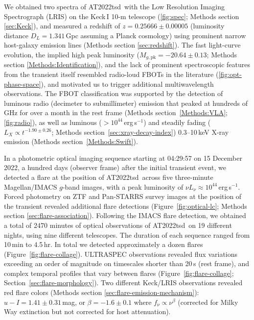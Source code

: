 \documentclass{nature_plusfigure}
\newcommand{\at}{AT2022tsd}
\begin{document}
We obtained two spectra of \at\ with the Low Resolution Imaging Spectrograph (LRIS\cite{Oke1995}) on the Keck\,I 10-m telescope (\ref{fig:spec}; Methods section \ref{sec:Keck}), and measured\cite{Ho2022_Astronote_Keck} a redshift of $z=0.25666\pm0.00005$ (luminosity distance $D_L=1.341\,$Gpc assuming a Planck cosmology\cite{Planck2020}) using prominent narrow host-galaxy emission lines (Methods section \ref{sec:redshift}). 
The fast light-curve evolution, the implied high peak luminosity ($M_{g,\mathrm{pk}}=-20.64\pm0.13$; Methods section \ref{Methods:Identification}), and the lack of prominent spectroscopic features from the transient itself resembled radio-loud FBOTs in the literature\cite{Prentice2018,Ho2020_Koala,Perley2019,Perley2021,Yao2022} (\ref{fig:opt-phase-space}), and motivated us to trigger additional multiwavelength observations.
The FBOT classification was supported by the detection of luminous radio (decimeter\cite{Ho2022Astronote_radio} to submillimeter) emission that peaked at hundreds of GHz for over a month in the rest frame (Methods section~\ref{Methods:VLA}; \ref{fig:radio}),
as well as luminous ($>10^{44}\,$erg\,s$^{-1}$) and steadily fading ($L_X\propto t^{-1.90\pm0.26}$; Methods section~\ref{sec:xray-decay-index}) 0.3--10\,keV X-ray emission\cite{Schulze2022Astronote_xray} (Methods section~\ref{Methods:Swift}).

In a photometric optical imaging sequence starting at 04:29:57 on 15 December 2022, a hundred days (observer frame) after the initial transient event, we detected\cite{Ho2022_Astronote_Flares} a flare at the position of \at\ across five three-minute Magellan/IMACS $g$-band images, with a peak luminosity of $\nu L_\nu \approx 10^{44}\,$erg\,s$^{-1}$.
Forced photometry on ZTF and Pan-STARRS survey images at the position of the transient revealed additional flare detections (Figure~\ref{fig:optical-lc}; Methods section \ref{sec:flare-association}).
Following the IMACS flare detection, we obtained a total of 2470 minutes of optical observations of \at\ on 19 different nights, using nine different telescopes. The duration of each sequence ranged from 10\,min to 4.5\,hr. In total we detected approximately a dozen flares (Figure~\ref{fig:flare-collage}). ULTRASPEC observations revealed flux variations exceeding an order of magnitude on timescales shorter than 20\,s (rest frame), and complex temporal profiles that vary between flares (Figure~\ref{fig:flare-collage}; Section~\ref{sec:flare-morphology}).
Two different Keck/LRIS observations revealed red flare colors (Methods section \ref{sec:flare-emission-mechanism}):
$u-I=1.41\pm0.31\,$mag, or $\beta=-1.6\pm0.1$ where
$f_\nu \propto \nu^{\beta}$ (corrected for Milky Way extinction but not corrected for host attenuation).
\end{document}
